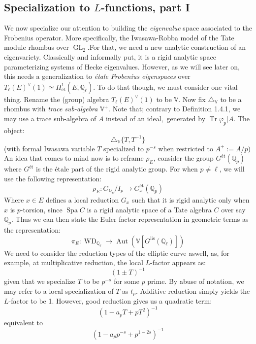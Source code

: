 \documentclass[9pt]{amsart}
\renewcommand{\[}{\begin{equation}}
\renewcommand{\]}{\end{equation}}
\newcommand{\on}{\operatorname}
\theoremstyle{plain}
\theoremstyle{remark}
\begin{document}
\subsection{Specialization to $L$-functions, part I} We now specialize our attention to building the \textit{eigenvalue} space associated to the Frobenius operator. More specifically, the Iwasawa-Robba model of the Tate module rhombus over $\on{GL}_2$.For that, we need a new analytic construction of an eigenvariety. Classically and informally put, it is a rigid analytic space parameterizing systems of Hecke eigenvalues. However, as we will see later on, this needs a generalization to \textit{étale Frobenius eigenspaces} over $T_{\ell}(E)^{\vee}(1) \simeq H^1_{\text{ét}}(E, \underline{\mathbb{Q}_{\ell}})$. To do that though, we must consider one vital thing. Rename the (group) algebra $T_{\ell}(E)^{\vee}(1)$ to be $\mathbb{V}$. Now fix $\triangle_{\mathbb{V}}$ to be a rhombus with \textit{trace sub-algebra} $\mathbb{V}^+$. Note that; contrary to Definition 1.4.1, we may use a trace sub-algebra of $A$ instead of an ideal,\ generated by $\on{Tr} \varphi_p | A$. The object:
\[\triangle_{\mathbb{V}}\{T, T^{-1}\}\] (with formal Iwasawa variable $T$ specialized to $p^{-s}$ when restricted to $A^+ := A/p$)\\
An idea that comes to mind now is to reframe $\rho_E$, consider the group $G^{\text{ét}}(\mathbb{Q}_p)$ where $G^{\text{ét}}$ is the étale part of the rigid analytic group. For when $p \neq \ell$, we will use the following representation:
\[\rho_E: G_{\mathbb{Q}_p}/I_p \to G^{\text{ét}}_x(\mathbb{Q}_p)\]
Where $x \in E$ defines a local reduction $G_x$ such that it is rigid analytic only when $x$ is $p$-torsion, since $\on{Spa} C$ is a rigid analytic space of a Tate algebra $C$ over say $\mathbb{Q}_p$.
Thus we can then state the Euler factor representation in geometric terms as the representation:
\[\pi_E: \on{WD}_{\mathbb{Q}_{\ell}} \to \on{Aut}(\mathbb{V}[G^{\text{lis}}(\mathbb{Q}_{\ell})])\]
We need to consider the reduction types of the elliptic curve aswell, as, for example, at multiplicative reduction, the local $L$-factor appears as:
\[(1\pm T)^{-1}\]
given that we specialize $T$ to be $p^{-s}$ for some $p$ prime. By abuse of notation, we may refer to a local specialization of $T$ as $t_p$. 
Additive reduction simply yields the $L$-factor to be 1. However, good reduction gives us a quadratic term:
\[(1 - a_p T + p{T^2})^{-1}\]
equivalent to 
\[(1- a_p p^{-s} + p^{1-2s})^{-1}\]
\end{document}

